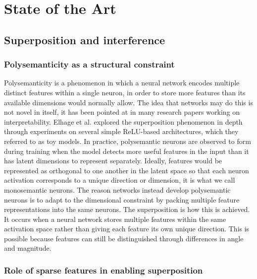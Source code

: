 \documentclass[12pt,a4paper]{report}
\begin{document}
\clearpage

\chapter{State of the Art}

\section{Superposition and interference}

\subsection{Polysemanticity as a structural constraint}

Polysemanticity is a phenomenon in which a neural network encodes multiple distinct
features within a single neuron, in order to store more features than its available dimensions would normally allow. The idea that networks may do this is not novel in itself, it
has been pointed at in many research papers working on interpretability. Elhage et al.\cite{elhage2022}
explored the superposition phenomenon in depth through experiments on several simple
ReLU-based architectures, which they referred to as toy models.
In practice, polysemantic neurons are observed to form during training when the
model detects more useful features in the input than it has latent dimensions to represent separately. Ideally, features would be represented as orthogonal to one another
in the latent space so that each neuron activation corresponds to a unique direction or
dimension, it is what we call monosemantic neurons. The reason networks instead develop polysemantic neurons is to adapt to the dimensional constraint by packing multiple
feature representations into the same neurons. The superposition is how this is achieved.
It occurs when a neural network stores multiple features within the same activation space
rather than giving each feature its own unique direction. This is possible because features
can still be distinguished through differences in angle and magnitude.

\subsection{Role of sparse features in enabling superposition}
\end{document}
